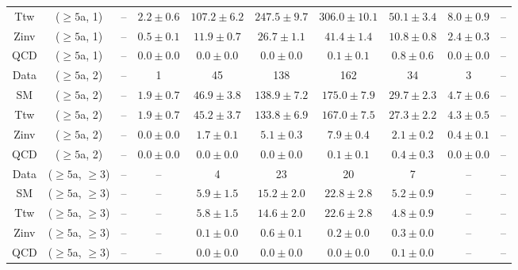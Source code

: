 \begin{table}[h!]
{\begin{tabular}{cccccccccc}
	Ttw & ($\ge5$a, 1) & -- & $2.2\pm 0.6$ & $107.2\pm 6.2$ & $247.5\pm 9.7$ & $306.0\pm 10.1$ & $50.1\pm 3.4$ & $8.0\pm 0.9$ & -- \\[0.5ex] 
	Zinv & ($\ge5$a, 1) & -- & $0.5\pm 0.1$ & $11.9\pm 0.7$ & $26.7\pm 1.1$ & $41.4\pm 1.4$ & $10.8\pm 0.8$ & $2.4\pm 0.3$ & -- \\[0.5ex] 
	QCD & ($\ge5$a, 1) & -- & $0.0\pm 0.0$ & $0.0\pm 0.0$ & $0.0\pm 0.0$ & $0.1\pm 0.1$ & $0.8\pm 0.6$ & $0.0\pm 0.0$ & -- \\[0.5ex] 
	Data & ($\ge5$a, 2) & -- & 1 & 45 & 138 & 162 & 34 & 3 & -- \\[0.5ex] 
	SM & ($\ge5$a, 2) & -- & $1.9\pm 0.7$ & $46.9\pm 3.8$ & $138.9\pm 7.2$ & $175.0\pm 7.9$ & $29.7\pm 2.3$ & $4.7\pm 0.6$ & -- \\[0.5ex] 
	Ttw & ($\ge5$a, 2) & -- & $1.9\pm 0.7$ & $45.2\pm 3.7$ & $133.8\pm 6.9$ & $167.0\pm 7.5$ & $27.3\pm 2.2$ & $4.3\pm 0.5$ & -- \\[0.5ex] 
	Zinv & ($\ge5$a, 2) & -- & $0.0\pm 0.0$ & $1.7\pm 0.1$ & $5.1\pm 0.3$ & $7.9\pm 0.4$ & $2.1\pm 0.2$ & $0.4\pm 0.1$ & -- \\[0.5ex] 
	QCD & ($\ge5$a, 2) & -- & $0.0\pm 0.0$ & $0.0\pm 0.0$ & $0.0\pm 0.0$ & $0.1\pm 0.1$ & $0.4\pm 0.3$ & $0.0\pm 0.0$ & -- \\[0.5ex] 
	Data & ($\ge5$a, $\ge3$) & -- & -- & 4 & 23 & 20 & 7 & -- & -- \\[0.5ex] 
	SM & ($\ge5$a, $\ge3$) & -- & -- & $5.9\pm 1.5$ & $15.2\pm 2.0$ & $22.8\pm 2.8$ & $5.2\pm 0.9$ & -- & -- \\[0.5ex] 
	Ttw & ($\ge5$a, $\ge3$) & -- & -- & $5.8\pm 1.5$ & $14.6\pm 2.0$ & $22.6\pm 2.8$ & $4.8\pm 0.9$ & -- & -- \\[0.5ex] 
	Zinv & ($\ge5$a, $\ge3$) & -- & -- & $0.1\pm 0.0$ & $0.6\pm 0.1$ & $0.2\pm 0.0$ & $0.3\pm 0.0$ & -- & -- \\[0.5ex] 
	QCD & ($\ge5$a, $\ge3$) & -- & -- & $0.0\pm 0.0$ & $0.0\pm 0.0$ & $0.0\pm 0.0$ & $0.1\pm 0.0$ & -- & -- \\[0.5ex] 
	\hline
	\hline
\end{tabular}}
\end{table}
